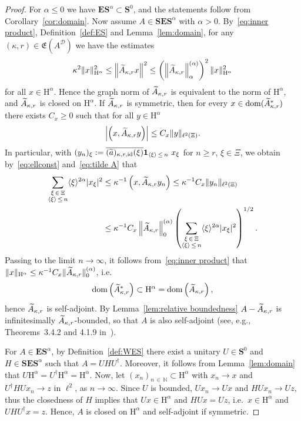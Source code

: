 \documentclass[AHL,Unicode,longabstracts,published]{cedram}
\DeclareMathOperator{\dom}{dom}
\DeclareMathOperator{\id}{id}
\newcommand{\RH}{\mathrm{H}}
\renewcommand{\mathsf}{\mathrm}
\newcommand{\sfH}{\mathsf{H}}
\newcommand{\N}{\mathbb N}
\newcommand{\CD}{\mathcal{D}}
\newcommand{\bone}{\boldsymbol 1}
\newcommand{\BE}{\mathbf E}
\newcommand{\BS}{\mathbf S}
\newcommand{\FE}{\mathfrak{E}}
\newcommand{\snorm}[3]{\left\| #1\right\|_{#3}^{(#2)}}
\newcommand{\ang}[1]{\langle #1 \rangle}
\newcommand{\er}{r}
\let\oldtilde\tilde
\renewcommand*{\tilde}[1]{\mathchoice{\widetilde{#1}}{\widetilde{#1}}{\oldtilde{#1}}{\oldtilde{#1}}}
\begin{document}
\begin{proof}
For $\alpha\leq 0$ we have $\BE\BS^\alpha\subset \BS^0$, and the statements follow from Corollary~\ref{cor:domain}. Now assume $A\in \BS\BE\BS^\alpha$ with $\alpha >0$. By~\eqref{eq:inner product}, Definition~\ref{def:ES} and Lemma~\ref{lem:domain}, for any $(\kappa,
\er)\in\FE(A^\CD)$ we have the estimates
\begin{equation}
\kappa^2\|x\|_{\sfH^\alpha}^2 \le \left\|\tilde A_{\kappa,\er}x\right\|^2 \le
\left(\left\|\tilde A_{\kappa,\er}\right\|^{(\alpha)}_{\alpha}\right)^2\|x\|_{\sfH^\alpha}^2
\end{equation}
for all $x \in \RH^\alpha$. Hence the graph norm of $\tilde A_{\kappa,\er}$ is equivalent to the norm of $\sfH^\alpha$, and $\tilde A_{\kappa,\er}$ is closed on $\sfH^\alpha$. If $\tilde A_{\kappa,\er}$ is symmetric, then for every $x\in\dom(\tilde A_{\kappa,\er}^*)$ there exists $C_x\geq 0$ such that for all $y \in \RH^\alpha$
\begin{equation}
\left|\left(x, \tilde A_{\kappa,\er}y\right)\right|\leq C_x\|y\|_{\ell^2(\Xi)}.
\end{equation}
In particular, with $(y_{n})_\xi:=\overline{(\tilde a)_{\kappa, \er, \id}(\xi)}\bone_{\ang
\xi\,\le\,n}\ x_\xi$ for $n\geq \er$, $\xi\in \Xi$, we obtain by~\eqref{eq:ellconst} and~\eqref{eq:tilde A} that
\begin{equation}
\begin{split}
\sum_{\substack{\xi\,\in\,\Xi \\
\ang \xi\,\le\,n}}\ang{\xi}^{2\alpha}|x_\xi|^2 &\leq \kappa^{-1}\left(x, \tilde A_{\kappa,\er}y_{n}\right)\leq
\kappa^{-1}C_x\|y_n\|_{\ell^2(\Xi)}\\
&\leq \kappa^{-1}C_x\snorm{\tilde{A}_{\kappa,\er}}{\alpha}{0}\left(\sum_{\substack{\xi\,\in\,\Xi \\ \ang \xi\,\le\,n}}\ang{\xi}^{2\alpha}|x_\xi|^2\right)^{1/2}.
\end{split}
\end{equation}
Passing to the limit $n\to \infty$, it follows from~\eqref{eq:inner product} that $\|x\|_{\sfH^\alpha} \leq
\kappa^{-1}C_x\|\tilde{A}_{\kappa,\er}\|^{(\alpha)}_{0}$, i.e.
\[
\dom\left(\tilde
A_{\kappa,\er}^*\right)\subset \sfH^\alpha =\dom\left(\tilde A_{\kappa,\er}\right),
\]
hence
$\tilde A_{\kappa,\er}$ is self-adjoint. By Lemma~\ref{lem:relative boundedness} $A -\tilde A_{\kappa,\er}$ is infinitesimally $\tilde A_{\kappa,\er}$-bounded, so that $A$ is also self-adjoint (see, e.g., Theorems~3.4.2 and 4.1.9 in~\cite{BirmanSolomyak}).

For $A\in\BE\BS^\alpha$, by Definition~\ref{def:WES} there exist a unitary $U\in\BS^0$ and $H\in\BS\BE\BS^\alpha$ such that $A=UH U^\dagger$. Moreover, it follows from Lemma~\ref{lem:domain} that $U\sfH^\alpha=U^\dagger\sfH^\alpha=\sfH^\alpha$. Now, let $(x_n)_{n\,\in\,\N}\subset\sfH^\alpha$ with $x_n\to x$ and $U^\dagger HUx_n\to z$ in $\ell^2$, as $n\to\infty$. Since $U$ is bounded, $Ux_n\to Ux$ and $HUx_n\to Uz$, thus the closedness of $H$ implies that $Ux\in \sfH^\alpha$ and $HUx=Uz$, i.e.~$x\in\sfH^\alpha$ and $U H U^\dagger x=z$. Hence, $A$ is closed on $\sfH^\alpha$ and self-adjoint if symmetric.
\end{proof}
\end{document}

